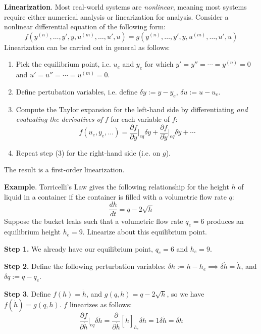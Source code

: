 \begin{framed}
    \textbf{Linearization}. Most real-world systems are \textit{nonlinear}, meaning most systems require either numerical analysis or linearization for analysis. Consider a nonlinear differential equation of the following form: \[f(y^{(n)},\dots,y',y,u^{(m)},\dots,u',u) = g(y^{(n)},\dots,y',y,u^{(m)},\dots,u',u)\] Linearization can be carried out in general as follows: \vspace{-1em}\begin{enumerate}
        \item[1.] Pick the equilibrium point, i.e. $u_e$ and $y_e$ for which $y' = y'' = \cdots = y^{(n)} = 0$ and $u' = u'' = \cdots = u^{(m)} = 0$.
        \item[2.] Define pertubation variables, i.e. define $\delta y := y-y_e$, $\delta u := u-u_e$.
        \item[3.] Compute the Taylor expansion for the left-hand side by differentiating \textit{and evaluating the derivatives of} $f$ for each variable of $f$: \[f(u_e, y_e,\dots) = \frac{\partial f}{\partial y}\bigg\rvert_{eq} \delta y + \frac{\partial f}{\partial \dot y}\bigg\rvert_{eq} \delta \dot y + \cdots\]
        \item[4.] Repeat step (3) for the right-hand side (i.e. on $g$).
    \end{enumerate}
    The result is a first-order linearization.
\end{framed}

\textbf{Example}. Torricelli's Law gives the following relationship for the height $h$ of liquid in a container if the container is filled with a volumetric flow rate $q$: \[\frac{dh}{dt} = q - 2\sqrt{h}\] Suppose the bucket leaks such that a volumetric flow rate $q_e = 6$ produces an equilibrium height $h_e = 9$. Linearize about this equilibrium point.

\textbf{Step 1.} We already have our equilibrium point, $q_e = 6$ and $h_e = 9$.

\textbf{Step 2.} Define the following perturbation variables: $\delta h := h-h_e \implies \delta \dot h = \dot h$, and $\delta q := q-q_e$.

\textbf{Step 3}.
Define $f(h) = \dot h$, and $g(q,h) = q-2\sqrt{h}$, so we have $f(\dot h) = g(q,h)$. $f$ linearizes as follows: \[\frac{\partial f}{\partial \dot h} \bigg\rvert_{eq} \delta \dot h = \frac{\partial}{\partial \dot h} \displaystyle\left[\dot h\right]_{h_{e}}\delta \dot h = 1\delta \dot h = \boxed{\delta \dot h}\]

